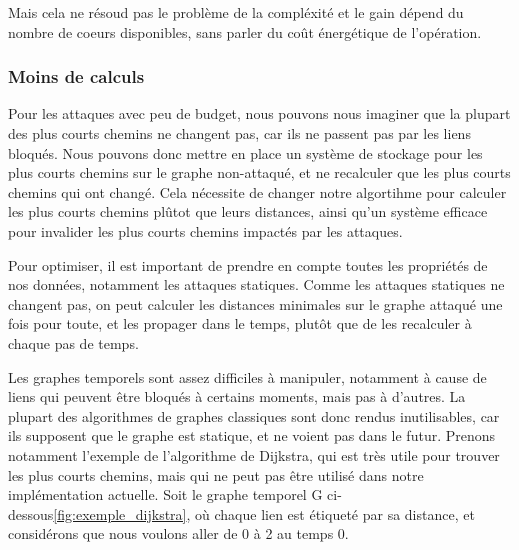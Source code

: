 \subsubsubsection*{}
Mais cela ne résoud pas le problème de la compléxité et le gain dépend du nombre de coeurs disponibles, sans parler du coût énergétique de l'opération.

\subsubsection{Moins de calculs}\label{subsubsec:moins_de_calculs}

\label{subsubsubsec:cache}
Pour les attaques avec peu de budget, nous pouvons nous imaginer que la plupart des plus courts chemins ne changent pas, car ils ne passent pas par les liens bloqués.
Nous pouvons donc mettre en place un système de stockage pour les plus courts chemins sur le graphe non-attaqué, et ne recalculer que les plus courts chemins qui ont changé.
Cela nécessite de changer notre algortihme pour calculer les plus courts chemins plûtot que leurs distances, ainsi qu'un système efficace pour invalider les plus courts chemins impactés par les attaques.

\label{subsubsubsec:proprietes_attaques_statiques}
Pour optimiser, il est important de prendre en compte toutes les propriétés de nos données, notamment les attaques statiques.
Comme les attaques statiques ne changent pas, on peut calculer les distances minimales sur le graphe attaqué une fois pour toute, et les propager dans le temps, plutôt que de les recalculer à chaque pas de temps.

\label{subsubsubsec:structure_de_donnees_opti}
Les graphes temporels sont assez difficiles à manipuler, notamment à cause de liens qui peuvent être bloqués à certains moments, mais pas à d'autres.
La plupart des algorithmes de graphes classiques sont donc rendus inutilisables, car ils supposent que le graphe est statique, et ne voient pas dans le futur.
Prenons notamment l'exemple de l'algorithme de Dijkstra, qui est très utile pour trouver les plus courts chemins, mais qui ne peut pas être utilisé dans notre implémentation actuelle.
Soit le graphe temporel G ci-dessous\ref{fig:exemple_dijkstra}, où chaque lien est étiqueté par sa distance, et considérons que nous voulons aller de 0 à 2 au temps 0.

